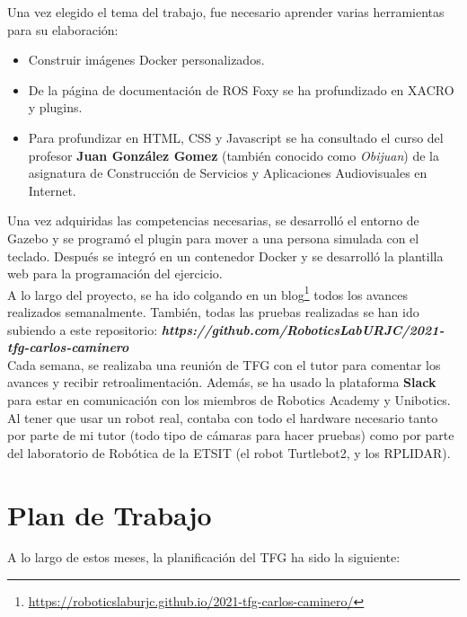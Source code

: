 Una vez elegido el tema del trabajo, fue necesario aprender varias herramientas para su elaboración:
\begin{itemize}
	\item Construir imágenes Docker personalizados.
	\item De la página de documentación de ROS Foxy se ha profundizado en XACRO y plugins.
	\item Para profundizar en HTML, CSS y Javascript se ha consultado el curso del profesor \textbf{Juan González Gomez} (también conocido como \textit{Obijuan}) de la asignatura de Construcción de Servicios y Aplicaciones Audiovisuales en Internet.
\end{itemize}

Una vez adquiridas las competencias necesarias, se desarrolló el entorno de Gazebo y se programó el plugin para mover a una persona simulada con el teclado. Después se integró en un contenedor Docker y se desarrolló la plantilla web para la programación del ejercicio.\\

A lo largo del proyecto, se ha ido colgando en un blog\footnote{\url{https://roboticslaburjc.github.io/2021-tfg-carlos-caminero/}} todos los avances realizados semanalmente. También, todas las pruebas realizadas se han ido subiendo a este repositorio: \textbf{\textit{https://github.com/RoboticsLabURJC/2021-tfg-carlos-caminero}}\\

Cada semana, se realizaba una reunión de TFG con el tutor para comentar los avances y recibir retroalimentación. Además, se ha usado la plataforma \textbf{Slack} para estar en comunicación con los miembros de Robotics Academy y Unibotics.\\

Al tener que usar un robot real, contaba con todo el hardware necesario tanto por parte de mi tutor (todo tipo de cámaras para hacer pruebas) como por parte del laboratorio de Robótica de la ETSIT (el robot Turtlebot2, y los RPLIDAR).



\section{Plan de Trabajo}
\label{sec:plan_trabajo}
A lo largo de estos meses, la planificación del TFG ha sido la siguiente:

